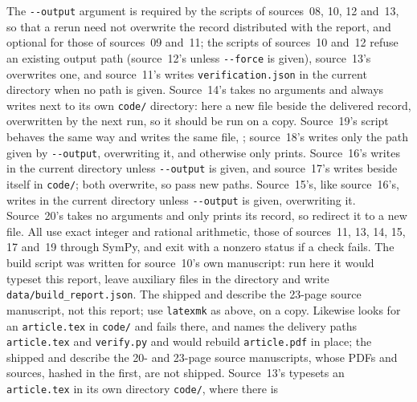 \documentclass[11pt]{article}
\numberwithin{equation}{section}
\theoremstyle{definition}
\theoremstyle{remark}
\begin{document}
The \verb|--output| argument is required by the scripts of sources~08, 10,
12 and~13, so that a rerun need not overwrite the record distributed with the
report, and optional for those of sources~09 and~11; the scripts of
sources~10 and~12 refuse an existing output path (source~12's unless
\verb|--force| is given), source~13's overwrites one, and source~11's writes
\texttt{verification.json} in the current directory when no path is given.
Source~14's takes no arguments and always writes
 next to its own \texttt{code/} directory: here a
new file beside the delivered record, overwritten by the next run, so it
should be run on a copy. Source~19's script behaves the same way and writes
the same file, ; source~18's writes only the
path given by \verb|--output|, overwriting it, and otherwise only prints.
Source~16's writes  in the current directory unless
\verb|--output| is given, and source~17's writes
 beside itself in \texttt{code/}; both
overwrite, so pass new paths. Source~15's, like source~16's, writes
 in the current directory unless \verb|--output| is
given, overwriting it. Source~20's takes no arguments and only prints its
record, so redirect it to a new file. All use exact integer and rational
arithmetic,
those of sources~11, 13, 14, 15, 17 and~19 through SymPy, and exit with a nonzero
status if a check fails. The build script
 was written for source~10's own
manuscript: run here it would typeset this report, leave auxiliary files in
the directory and write \texttt{data/build\_report.json}. The shipped
 and
 describe the 23-page
source manuscript, not this report; use \texttt{latexmk} as above, on a copy.
Likewise  looks for an
\texttt{article.tex} in \texttt{code/} and fails there, and
 names the delivery paths
\texttt{article.tex} and \texttt{verify.py} and would rebuild
\texttt{article.pdf} in place; the shipped
 and
 describe the 20-
and 23-page source manuscripts, whose PDFs and sources, hashed in the first,
are not shipped. Source~13's  typesets
an \texttt{article.tex} in its own directory \texttt{code/}, where there is
\end{document}
